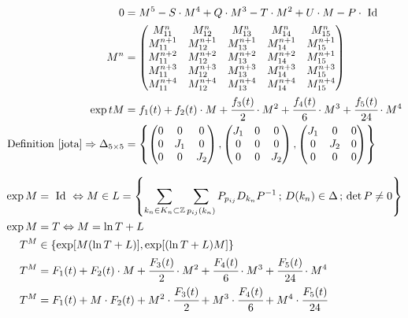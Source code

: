 \documentclass[12pt,a4paper]{article}
\begin{document}
\begin{align}
  0 &= M^5 - S\cdot M^4 + Q\cdot M^3 - T\cdot M^2 + U\cdot M - P\cdot\text{ Id } \\
   M^n &= \begin{pmatrix} M_{11}^n & M_{12}^n & M_{13}^n & M_{14}^n & M_{15}^n \\ M^{n+1}_{11} & M^{n+1}_{12} & M^{n+1}_{13}  & M^{n+1}_{14} & M^{n+1}_{15} \\ M^{n+2}_{11} & M^{n+2}_{12} & M^{n+2}_{13} & M^{n+2}_{14}& M^{n+1}_{15} \\ M^{n+3}_{11} & M^{n+3}_{12} & M^{n+3}_{13} & M^{n+3}_{14} & M^{n+3}_{15} \\ M^{n+4}_{11} & M^{n+4}_{12} & M^{n+4}_{13} & M^{n+4}_{14} & M^{n+4}_{15}  \end{pmatrix} \\
  \exp tM &= f_1(t) + f_2(t) \cdot M + \cfrac{f_3(t)}{2} \cdot M^2 + \cfrac{f_4(t)}{6} \cdot M^3 + \cfrac{f_5(t)}{24} \cdot M^4 \\
  \text{Definition } \ref{jota} \Rightarrow \Delta_{5 \times 5} &= \left\{ \left( \begin{matrix} 0 & 0 & 0 \\ 0 & J_1 & 0 \\ 0 & 0 & J_2 \end{matrix}\right), \left( \begin{matrix} J_1 & 0 & 0 \\ 0 & 0 & 0 \\ 0 & 0 & J_2 \end{matrix}\right), \left( \begin{matrix} J_1 & 0 & 0 \\ 0 & J_2 & 0 \\ 0 & 0 & 0 \end{matrix}\right)  \right\}
 \end{align}

\begin{align}
  \exp M &= \text{ Id } \Leftrightarrow M \in L = \left\{ \sum_{k_n \in K_n \subset \mathbb{Z}} \sum_{p_{ij}(k_n)} P_{p_{ij}} D_{k_n} P^{-1} \,;\, D(k_n) \in \Delta\,;\,\det P \ne 0 \right\} \\
  \exp M &= T \Leftrightarrow M = \ln T + L \\
  T^M &\in \{ \exp [M (\ln T + L)], \exp [(\ln T + L) M] \} \\
  T^M &= F_1(t) + F_2(t) \cdot M + \cfrac{F_3(t)}{2} \cdot M^2 + \cfrac{F_4(t)}{6} \cdot M^3 + \cfrac{F_5(t)}{24} \cdot M^4 \\
  T^M &= F_1(t) + M \cdot F_2(t) + M^2 \cdot \cfrac{F_3(t)}{2} + M^3 \cdot \cfrac{F_4(t)}{6} + M^4 \cdot \cfrac{F_5(t)}{24}
\end{align}
\end{document}
